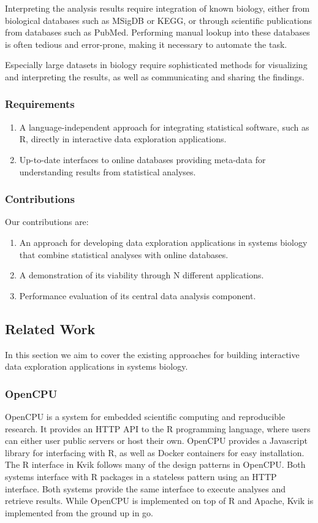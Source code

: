 Interpreting the analysis results require integration of known biology, either
from biological databases such as MSigDB\cite{} or KEGG\cite{}, or through
scientific publications from databases such as PubMed\cite{}. Performing manual
lookup into these databases is often tedious and error-prone, making it
necessary to automate the task. %

Especially large datasets in biology require sophisticated methods for
visualizing and interpreting the results, as well as communicating and sharing
the findings.


\subsubsection*{Requirements} 
\begin{enumerate}
    \item A language-independent approach for integrating statistical software,
    such as R, directly in interactive data exploration applications.
    \item Up-to-date interfaces to online databases providing meta-data for
    understanding results from statistical analyses. 
\end{enumerate} 

\subsubsection*{Contributions} 
Our contributions are: 
\begin{enumerate}
\item An approach for developing data exploration applications in systems
biology that combine statistical analyses with online databases.  
\item A demonstration of its viability through N different applications. 
\item Performance evaluation of its central data analysis component. 
\end{enumerate} 


\subsection*{Related Work} 
In this section we aim to cover the existing approaches for building interactive
data exploration applications in systems biology. 

\subsubsection*{OpenCPU} 
OpenCPU is a system for embedded scientific computing and reproducible
research.\cite{opencpu} It provides an HTTP API to the R programming language,
where users can either user public servers or host their own. OpenCPU provides
a Javascript library for interfacing with R, as well as Docker containers for
easy installation. 
The R interface in Kvik follows many of the design patterns in OpenCPU. Both
systems interface with R packages in a stateless pattern using an HTTP
interface. Both systems provide the same interface to execute analyses and
retrieve results. While OpenCPU is implemented on top of R and Apache, Kvik is
implemented from the ground up in go. 

